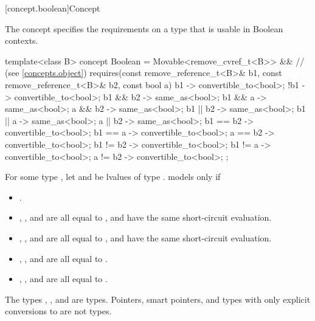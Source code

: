 [concept.boolean]{Concept }

\pnum
The  concept specifies the requirements on a type that is
usable in Boolean contexts.

%
\begin{itemdecl}
template<class B>
  concept Boolean =
    Movable<remove_cvref_t<B>> && // (see \ref{concepts.object})
    requires(const remove_reference_t<B>& b1,
             const remove_reference_t<B>& b2, const bool a) {
      { b1 } -> convertible_to<bool>;
      { !b1 } -> convertible_to<bool>;
      { b1 && b2 } -> same_as<bool>;
      { b1 &&  a } -> same_as<bool>;
      {  a && b2 } -> same_as<bool>;
      { b1 || b2 } -> same_as<bool>;
      { b1 ||  a } -> same_as<bool>;
      {  a || b2 } -> same_as<bool>;
      { b1 == b2 } -> convertible_to<bool>;
      { b1 ==  a } -> convertible_to<bool>;
      {  a == b2 } -> convertible_to<bool>;
      { b1 != b2 } -> convertible_to<bool>;
      { b1 !=  a } -> convertible_to<bool>;
      {  a != b2 } -> convertible_to<bool>;
    };
\end{itemdecl}

\pnum
For some type , let  and  be
lvalues of type .
 models  only if

\begin{itemize}
\item {}.
\item {}, , and
       are all equal to
      , and have the same short-circuit
      evaluation.
\item {}, , and
       are all equal to
      , and have the same short-circuit
      evaluation.
\item {}, , and
       are all equal to
      .
\item {}, , and
       are all equal to
      .
\end{itemize}

\pnum
\begin{example}
The types , , and
 are 
types. Pointers, smart pointers, and types with only explicit conversions to
 are not  types.
\end{example}

